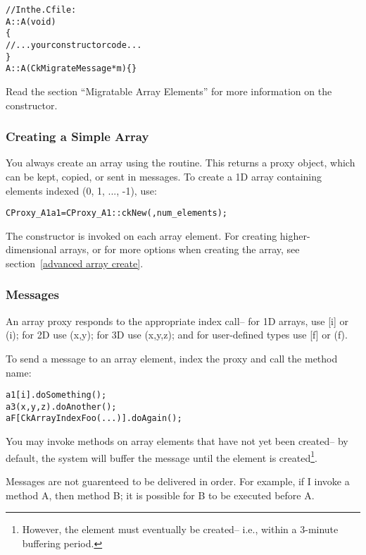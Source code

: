 \begin{alltt}
//In the .C file:
A::A(void)
\{
  //...your constructor code...
\}
A::A(CkMigrateMessage *m) \{ \}
\end{alltt}

Read the section ``Migratable Array Elements'' for more
information on the  constructor. 


\subsubsection{Creating a Simple Array}

\label{basic array creation}

You always create an array using the 
routine.  This returns a proxy object, which can
be kept, copied, or sent in messages.
To create a 1D array containing elements indexed 
(0, 1, ..., -1), use:

\begin{alltt}
CProxy_A1 a1 = CProxy_A1::ckNew(,num_elements);
\end{alltt}

The constructor is invoked on each array element.
For creating higher-dimensional arrays, or for more options
when creating the array, see section~\ref{advanced array create}.


\subsubsection{Messages}

An array proxy responds to the appropriate index call--
for 1D arrays, use [i] or (i); for 2D use (x,y); for 3D
use (x,y,z); and for user-defined types use [f] or (f).

To send a  message to an array element, index the proxy 
and call the method name:

\begin{alltt}
a1[i].doSomething();
a3(x,y,z).doAnother();
aF[CkArrayIndexFoo(...)].doAgain();
\end{alltt}

You may invoke methods on array elements that have not yet
been created-- by default, the system will buffer the message until the
element is created\footnote{However, the element must eventually be 
created-- i.e., within a 3-minute buffering period.}.

Messages are not guarenteed to be delivered in order.
For example, if I invoke a method A, then method B;
it is possible for B to be executed before A.

